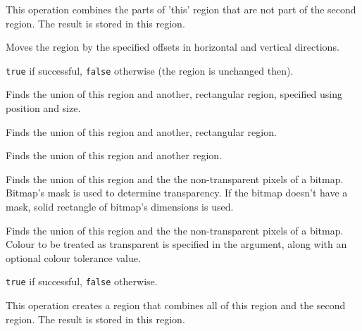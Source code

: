 This operation combines the parts of 'this' region that are not part of the second region.
The result is stored in this region.

\label{wxregionoffset}


Moves the region by the specified offsets in horizontal and vertical
directions.


{\tt true} if successful, {\tt false} otherwise (the region is unchanged then).

\label{wxregionunion}


Finds the union of this region and another, rectangular region, specified using position and size.


Finds the union of this region and another, rectangular region.


Finds the union of this region and another region.


Finds the union of this region and the the non-transparent pixels of a
bitmap. Bitmap's mask is used to determine transparency. If the bitmap doesn't
have a mask, solid rectangle of bitmap's dimensions is used.


Finds the union of this region and the the non-transparent pixels of a
bitmap. Colour to be treated as transparent is specified in the
 argument, along with an
optional colour tolerance value.


{\tt true} if successful, {\tt false} otherwise.


This operation creates a region that combines all of this region and the second region.
The result is stored in this region.

